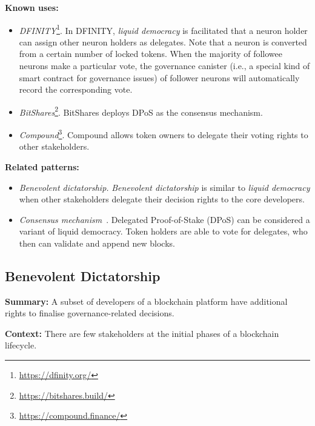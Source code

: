 \documentclass{article}
\begin{document}
\vspace{0.5em}\noindent \textbf{Known uses:}  
 \begin{itemize}
   \item \textit{DFINITY}\footnote{\url{https://dfinity.org/}}. In DFINITY, \textit{liquid democracy} is facilitated that a neuron holder can assign other neuron holders as delegates. Note that a neuron is converted from a certain number of locked tokens. When the majority of followee neurons make a particular vote, the governance canister (i.e., a special kind of smart contract for governance issues) of follower neurons will automatically record the corresponding vote.
 
   \item \textit{BitShares}\footnote{\url{https://bitshares.build/}}. BitShares deploys DPoS as the consensus mechanism.
   
   \item \textit{Compound}\footnote{\url{https://compound.finance/}}. Compound allows token owners to delegate their voting rights to other stakeholders.
 \end{itemize}
 

\vspace{0.5em}\noindent \textbf{Related patterns:} 

\begin{itemize}
   
    \item \textit{Benevolent dictatorship.} \textit{Benevolent dictatorship} is similar to \textit{liquid democracy} when other stakeholders delegate their decision rights to the core developers.
    
    \item \textit{Consensus mechanism}~\cite{consensus_survey}. Delegated Proof-of-Stake (DPoS) can be considered a variant of liquid democracy. Token holders are able to vote for delegates, who then can validate and append new blocks.
\end{itemize}


\subsection{Benevolent Dictatorship}

\vspace{0.5em}\noindent \textbf{Summary:} A subset of developers of a blockchain platform have additional rights to finalise governance-related decisions.

\vspace{0.5em}\noindent \textbf{Context:} There are few stakeholders at the initial phases of a blockchain lifecycle.
\end{document}
